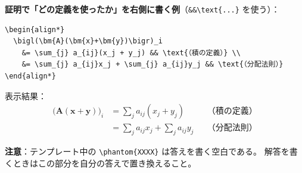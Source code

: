 \documentclass[a4paper,dvipdfmx]{jsarticle}
\newcommand{\提出期限}{2026年10月12日（月）}
\newcommand{\学籍番号}{0000000}
\newcommand{\氏名}{氏名を書く}
\newcommand{\提出日}{2026年10月12日}
\begin{document}
\noindent
\textbf{証明で「どの定義を使ったか」を右側に書く例}（\verb|&&\text{...}| を使う）：
\begin{verbatim}
\begin{align*}
  \bigl(\bm{A}(\bm{x}+\bm{y})\bigr)_i
    &= \sum_{j} a_{ij}(x_j + y_j) && \text{（積の定義）} \\
    &= \sum_{j} a_{ij}x_j + \sum_{j} a_{ij}y_j && \text{（分配法則）}
\end{align*}
\end{verbatim}
表示結果：
\begin{align*}
  \bigl(\bm{A}(\bm{x}+\bm{y})\bigr)_i
    &= \sum_{j} a_{ij}(x_j + y_j) && \text{（積の定義）} \\
    &= \sum_{j} a_{ij}x_j + \sum_{j} a_{ij}y_j && \text{（分配法則）}
\end{align*}

\noindent
\textbf{注意}：テンプレート中の \verb|\phantom{XXXX}| は答えを書く空白である。
解答を書くときはこの部分を自分の答えで置き換えること。
\end{document}
